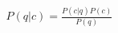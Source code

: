 \documentclass[preview]{standalone}
\begin{document}
\begin{align*}
P(q|c) = \frac{P(c|q)P(c)}{P(q)}
\end{align*}
\end{document}
